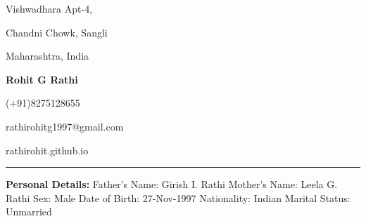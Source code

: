 \documentclass[11pt]{article}
\begin{document}
	\begin{center}
		\begin{minipage}[b]{0.33333\textwidth}
			\raggedright
			Vishwadhara Apt-4,\par
			Chandni Chowk, Sangli\par
			Maharashtra, India
		\end{minipage}%
		\begin{minipage}[b]{0.33333\textwidth}
			\centering
			\begin{huge}
				\textbf{Rohit G Rathi}		
			\end{huge}
		\end{minipage}%
		\begin{minipage}[b]{0.33333\textwidth}
			\raggedleft
			(+91)8275128655\par
			rathirohitg1997@gmail.com\par
			rathirohit.github.io\par
		\end{minipage}%
		\bigskip
		\hrule
		\bigskip
		\smallskip
		\begin{minipage}[t]{0.3\textwidth}
			\raggedright\smallskip
			\begin{LARGE}
				\textbf{Personal Details:}\medskip\linebreak%
				{\small Father's Name: Girish I. Rathi}\linebreak%
				{\small Mother's Name: Leela G. Rathi}\linebreak%
				{\small Sex: Male}\linebreak%
				{\small Date of Birth: 27-Nov-1997}\linebreak%
				{\small Nationality: Indian}\linebreak%
				{\small Marital Status: Unmarried}\linebreak%
			\end{LARGE}
		\end{minipage}%
		\begin{minipage}[t]{0.4\textwidth}
			\centering
			\strut\vspace*{-\baselineskip}\newline
			\setlength{\fboxsep}{4pt}%
			\setlength{\fboxrule}{1pt}%

\end{minipage}
\end{center}
\end{document}
